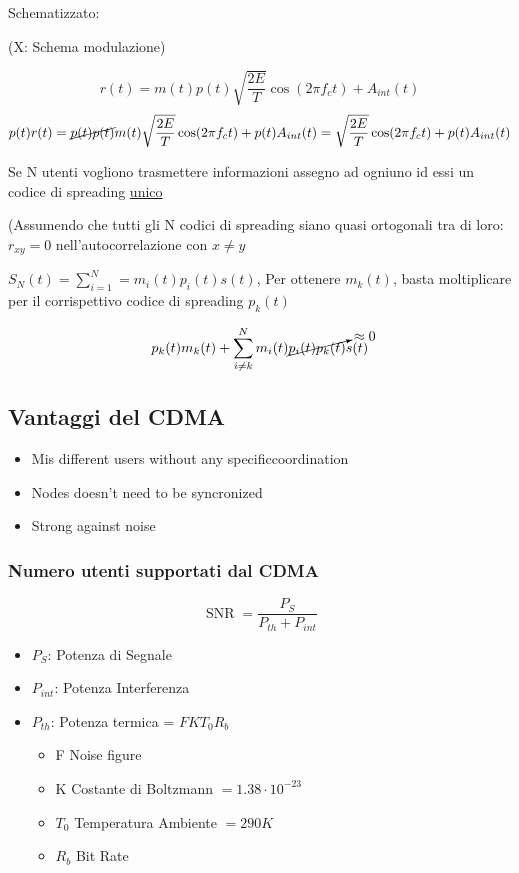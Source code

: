 \documentclass{article}
\DeclareMathOperator\snr{SNR}
\begin{document}
Schematizzato:

(X: Schema modulazione)

\[r(t) = m(t)p(t)\sqrt{\frac{2E}{T}}\cos(2\pi f_c t) + A_{int}(t) \]
\[p(t)r(t) = \cancel{p(t) p(t)}m(t) \sqrt{\frac{2E}{T}}\cos(2\pi f_c t) + p(t)A_{int}(t)
= \sqrt{\frac{2E}{T}}\cos(2\pi f_c t) + p(t)A_{int}(t) \]

Se N utenti vogliono trasmettere informazioni assegno ad ogniuno id essi un codice di spreading \underline{unico}

(Assumendo che tutti gli N codici di spreading siano quasi ortogonali tra di loro: $r_{xy} = 0$ nell'autocorrelazione con $x \ne y$

\( S_N(t) = \sum^N_{i=1} = m_i(t)p_i(t)s(t)\), Per ottenere $m_k(t)$, basta moltiplicare per il corrispettivo codice di spreading $p_k(t)$

\[ p_k(t) m_k(t) + \sum^N_{i \neq k} m_i(t)\cancelto{\approx 0}{p_i(t)p_k(t)}s(t) \]

\subsection{Vantaggi del CDMA}
\begin{itemize}
    \item Mis different users without any specificcoordination
    \item Nodes doesn't need to be syncronized
    \item Strong against noise
\end{itemize}
\subsubsection{Numero utenti supportati dal CDMA}
\begin{minipage}{0.5\textwidth}
    \[ \snr = \frac{P_S}{P_{th} + P_{int}} \]
\end{minipage}
\begin{minipage}{0.5\textwidth}
    \begin{itemize}
        \item $P_S$: Potenza di Segnale
        \item $P_{int}$: Potenza Interferenza
        \item $P_{th}$: Potenza termica = $FKT_0R_b$
            \begin{itemize}
                \item F Noise figure
                \item K Costante di Boltzmann $= 1.38 \cdot 10^{-23}$
                \item $T_0$ Temperatura Ambiente $= 290K$
                \item $R_b$ Bit Rate
            \end{itemize}
    \end{itemize}
\end{minipage}
\end{document}
